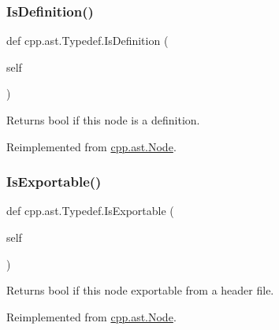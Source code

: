 \mbox{\label{classcpp_1_1ast_1_1Typedef_a103bf391e665884bfbfd20fc5e6d1a19}} 
\subsubsection{\texorpdfstring{IsDefinition()}{IsDefinition()}}
{\footnotesize\ttfamily def cpp.\+ast.\+Typedef.\+Is\+Definition (\begin{DoxyParamCaption}\item[{}]{self }\end{DoxyParamCaption})}

\begin{DoxyVerb}Returns bool if this node is a definition.\end{DoxyVerb}
 

Reimplemented from \mbox{\hyperlink{classcpp_1_1ast_1_1Node_a684ee9a357168e7e07a24fc6812f66e6}{cpp.\+ast.\+Node}}.

\mbox{\label{classcpp_1_1ast_1_1Typedef_adee58e4674b049d8e4435b5b6ad8e1d4}} 
\subsubsection{\texorpdfstring{IsExportable()}{IsExportable()}}
{\footnotesize\ttfamily def cpp.\+ast.\+Typedef.\+Is\+Exportable (\begin{DoxyParamCaption}\item[{}]{self }\end{DoxyParamCaption})}

\begin{DoxyVerb}Returns bool if this node exportable from a header file.\end{DoxyVerb}
 

Reimplemented from \mbox{\hyperlink{classcpp_1_1ast_1_1Node_a313273874ccf578485006d4000128234}{cpp.\+ast.\+Node}}.

\mbox{\label{classcpp_1_1ast_1_1Typedef_aa9f65f4a97ba340f2c9ebc5e7ce27e8c}} 
